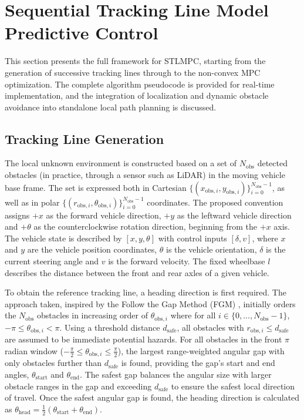 \documentclass[journal]{IEEEtran}
\begin{document}
\section{Sequential Tracking Line Model Predictive Control}\label{sec3}
This section presents the full framework for STLMPC, starting from the generation of successive tracking lines through to the non-convex MPC optimization. The complete algorithm pseudocode is provided for real-time implementation, and the integration of localization and dynamic obstacle avoidance into standalone local path planning is discussed.
\subsection{Tracking Line Generation}
The local unknown environment is constructed based on a set of $N_{\text{obs}}$ detected obstacles (in practice, through a sensor such as LiDAR) in the moving vehicle base frame. The set is expressed both in Cartesian $\{{(x_{{\text{obs}},i}, y_{{\text{obs}},i})}\}_{i=0}^{N_{{\text{obs}}}-1}$, as well as in polar $\{{(r_{{\text{obs}},i}, \theta_{{\text{obs}},i})}\}_{i=0}^{N_{{\text{obs}}}-1}$ coordinates. The proposed convention assigns $+x$ as the forward vehicle direction, $+y$ as the leftward vehicle direction and $+\theta$ as the counterclockwise rotation direction, beginning from the $+x$ axis. The vehicle state is described by $[x,y,\theta]$ with control inputs $[\delta,v]$, where $x$ and $y$ are the vehicle position coordinates, $\theta$ is the vehicle orientation, $\delta$ is the current steering angle and $v$ is the forward velocity. The fixed wheelbase $l$ describes the distance between the front and rear axles of a given vehicle.

To obtain the reference tracking line, a heading direction is first required. The approach taken, inspired by the Follow the Gap Method (FGM) \cite{Sezer2012}, initially orders the $N_{\text{obs}}$ obstacles in increasing order of $\theta_{\text{obs},i}$ where for all $i \in\{{0,...,N_{\text{obs}}-1}\}$, $-\pi\leq \theta_{\text{obs},i} < \pi$. Using a threshold distance $d_{\text{safe}}$, all obstacles with $r_{\text{obs},i}\leq d_{\text{safe}}$ are assumed to be immediate potential hazards. For all obstacles in the front $\pi$ radian window ($-\frac{\pi}{2}\leq \theta_{\text{obs},i} \leq \frac{\pi}{2}$), the largest range-weighted angular gap with only obstacles further than $d_{\text{safe}}$ is found, providing the gap's start and end angles, $\theta_{\text{start}}$ and $\theta_{\text{end}}$. The safest gap balances the angular size with larger obstacle ranges in the gap and exceeding $d_{\text{safe}}$ to ensure the safest local direction of travel. Once the safest angular gap is found, the heading direction is calculated as $\theta_{\text{head}}=\frac{1}{2}(\theta_{\text{start}}+\theta_{\text{end}})$.
\end{document}
